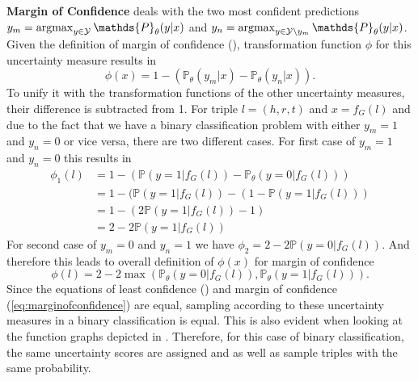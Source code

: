 \textbf{Margin of Confidence}
deals with the two most confident predictions $y_m = \argmax_{y \in \mathcal{Y}} \mathds{P}_{\theta}(y | x)$ and $y_n = \argmax_{y \in \mathcal{Y} \setminus y_m}{\mathds{P}_{\theta}(y | x)}$.
Given the definition of margin of confidence (), transformation function $\phi$ for this uncertainty measure results in
\begin{equation}
    \phi(x) = 1 - (\mathds{P}_{\theta}(y_m |x) - \mathds{P}_{\theta}(y_n | x)).
\end{equation}
To unify it with the transformation functions of the other uncertainty measures, their difference is subtracted from 1.
For triple $l = (h,r,t)$ and $x = f_G(l)$ and due to the fact that we have a binary classification problem with either $y_m = 1$ and $y_n = 0$ or vice versa, there are two different cases.
For first case of $y_m = 1$ and $y_n = 0$ this results in
\begin{equation}
\begin{split}
\phi_1(l) 
&= 1 - (\mathds{P}(y = 1 |f_G(l)) - \mathds{P}_{\theta}(y = 0 | f_G(l))) \\
&= 1 - (\mathds{P}(y = 1 |f_G(l)) -  (1 - \mathds{P}(y = 1 | f_G(l))) \\
&= 1 - (2 \mathds{P}(y = 1 |f_G(l)) - 1) \\
&= 2 - 2 \mathds{P}(y = 1 |f_G(l))
\end{split}
\end{equation}
For second case of $y_m = 0$ and $y_n = 1$ we have  $\phi_2 = 2 - 2 \mathds{P}(y = 0 |f_G(l))$. 
And therefore this leads to overall definition of $\phi(x)$ for margin of confidence
\begin{equation} \label{eq:marginofconfidence}
    \phi(l) = 2 - 2 \max(\mathds{P}_{\theta}(y = 0 |f_G(l)), \mathds{P}_{\theta}(y = 1 |f_G(l))).
\end{equation}
Since the equations of least confidence () and margin of confidence (\ref{eq:marginofconfidence}) are equal, sampling according to these uncertainty measures in a binary classification is equal.
This is also evident when looking at the function graphs depicted in .
Therefore, for this case of binary classification, the same uncertainty scores are assigned and \usmax as well as \ussoftmax sample triples with the same probability.

